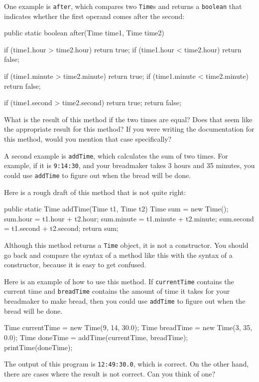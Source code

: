 \documentclass{book}
\begin{document}
One example is {\tt after}, which compares two {\tt Time}s and
returns a {\tt boolean} that indicates whether the first operand
comes after the second:

\begin{verbatimtab}
  public static boolean after(Time time1, Time time2) {
    if (time1.hour > time2.hour) return true;
    if (time1.hour < time2.hour) return false;

    if (time1.minute > time2.minute) return true;
    if (time1.minute < time2.minute) return false;

    if (time1.second > time2.second) return true;
    return false;
  }
\end{verbatimtab}
%
What is the result of this method if the two times are equal?  Does
that seem like the appropriate result for this method?  If you were
writing the documentation for this method, would you mention that case
specifically?

A second example is {\tt addTime}, which calculates the sum of two
times.  For example, if it is {\tt 9:14:30}, and your breadmaker takes
3 hours and 35 minutes, you could use {\tt addTime} to figure out when
the bread will be done.

Here is a rough draft of this method that is not quite right:

\begin{verbatimtab}
  public static Time addTime(Time t1, Time t2) {
    Time sum = new Time();
    sum.hour = t1.hour + t2.hour;
    sum.minute = t1.minute + t2.minute;
    sum.second = t1.second + t2.second;
    return sum;
  }
\end{verbatimtab}
%
Although this method returns a {\tt Time} object, it is not
a constructor.  You should go back and compare the syntax of
a method like this with the syntax of a constructor, because
it is easy to get confused.

Here is an example of how to use this method.  If {\tt currentTime}
contains the current time and {\tt breadTime} contains the amount
of time it takes for your breadmaker to make bread, then you
could use {\tt addTime} to figure out when the bread will be
done.

\begin{verbatimtab}
    Time currentTime = new Time(9, 14, 30.0);
    Time breadTime = new Time(3, 35, 0.0);
    Time doneTime = addTime(currentTime, breadTime);
    printTime(doneTime);
\end{verbatimtab}
%
The output of this program is {\tt 12:49:30.0}, which is
correct.  On the other hand, there are cases where the result
is not correct.  Can you think of one?
\end{document}
